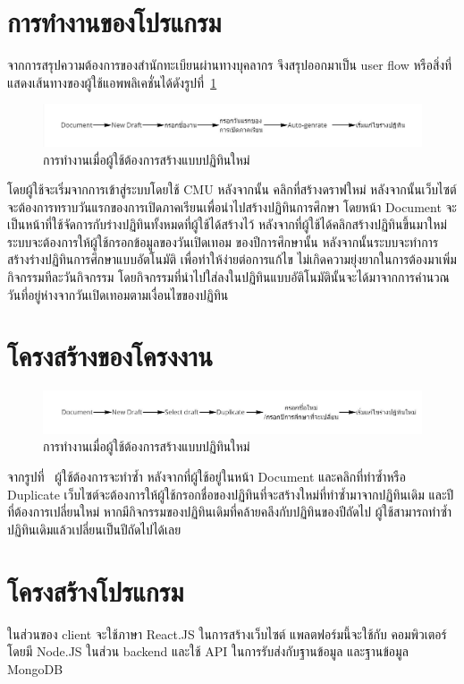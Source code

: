 
\section{การทำงานของโปรแกรม}
จากการสรุปความต้องการของสำนักทะเบียนผ่านทางบุคลากร จึงสรุปออกมาเป็น user flow หรือสิ่งที่แสดงเส้นทางของผู้ใช้แอพพลิเคชั่นได้ดังรูปที่~\ref{fig:user-flow-new}
%
\begin{figure}[h]
\centering
\includegraphics[width=1\textwidth]{pic3.1.jpg}
\caption{การทำงานเมื่อผู้ใช้ต้องการสร้างแบบปฏิทินใหม่}
\label{fig:user-flow-new}
\end{figure}
%
โดยผู้ใช้จะเริ่มจากการเข้าสู่ระบบโดยใช้ CMU  หลังจากนั้น คลิกที่สร้างดราฟใหม่ 
หลังจากนั้นเว็บไซต์จะต้องการทราบวันแรกของการเปิดภาคเรียนเพื่อนำไปสร้างปฏิทินการศึกษา
โดยหน้า Document จะเป็นหน้าที่ใช้จัดการกับร่างปฏิทินทั้งหมดที่ผู้ใช้ได้สร้างไว้
หลังจากที่ผู้ใช้ได้คลิกสร้างปฏิทินขึ้นมาใหม่ ระบบจะต้องการให้ผู้ใช้กรอกข้อมูลของวันเปิดเทอม
ของปีการศึกษานั้น หลังจากนั้นระบบจะทำการสร้างร่างปฏิทินการศึกษาแบบอัตโนมัติ
เพื่อทำให้ง่ายต่อการแก้ไข ไม่เกิดความยุ่งยากในการต้องมาเพิ่มกิจกรรมทีละวันกิจกรรม
โดยกิจกรรมที่นำไปใส่ลงในปฏิทินแบบอัติโนมัตินั้นจะได้มาจากการคำนวณ
วันที่อยู่ห่างจากวันเปิดเทอมตามเงื่อนไขของปฏิทิน

\section{โครงสร้างของโครงงาน}

\begin{figure}[h]
\centering
\includegraphics[width=1\textwidth]{pic3.2.jpg}
\caption{การทำงานเมื่อผู้ใช้ต้องการสร้างแบบปฏิทินใหม่}
\end{figure}

จากรูปที่~ ผู้ใช้ต้องการจะทำซ้ำ หลังจากที่ผู้ใช้อยู่ในหน้า Document และคลิกที่ทำซ้ำหรือ Duplicate
เว็บไซต์จะต้องการให้ผู้ใช้กรอกชื่อของปฏิทินที่จะสร้างใหม่ที่ทำซ้ำมาจากปฏิทินเดิม
และปีที่ต้องการเปลี่ยนใหม่ หากมีกิจกรรมของปฏิทินเดิมที่คล้ายคลึงกับปฏิทินของปีถัดไป 
ผู้ใช้สามารถทำซ้ำปฏิทินเดิมแล้วเปลี่ยนเป็นปีถัดไปได้เลย

\section{โครงสร้างโปรแกรม}
ในส่วนของ client จะใช้ภาษา React.JS ในการสร้างเว็บไซต์ แพลตฟอร์มนี้จะใช้กับ
คอมพิวเตอร์ โดยมี Node.JS ในส่วน backend และใช้ API ในการรับส่งกับฐานข้อมูล
และฐานข้อมูล MongoDB

